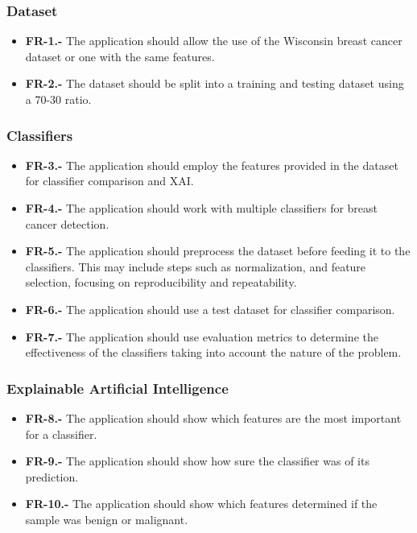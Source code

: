 \subsubsection{Dataset}

\begin{itemize}
    \item \textbf{FR-1.-} The application should allow the use of the Wisconsin breast cancer dataset or one with the same features.
    \item \textbf{FR-2.-} The dataset should be split into a training and testing dataset using a 70-30 ratio.
\end{itemize}

\subsubsection{Classifiers}

\begin{itemize}
    \item \textbf{FR-3.-} The application should employ the features provided in the dataset for classifier comparison and XAI.
    \item \textbf{FR-4.-} The application should work with multiple classifiers for breast cancer detection.
    \item \textbf{FR-5.-} The application should preprocess the dataset before feeding it to the classifiers. This may include steps such as normalization, and feature selection, focusing on reproducibility and repeatability.
    \item \textbf{FR-6.-} The application should use a test dataset for classifier comparison.
    \item \textbf{FR-7.-} The application should use evaluation metrics to determine the effectiveness of the classifiers taking into account the nature of the problem.
\end{itemize}

\subsubsection{Explainable Artificial Intelligence}

\begin{itemize}
    \item \textbf{FR-8.-} The application should show which features are the most important for a classifier.
    \item \textbf{FR-9.-} The application should show how sure the classifier was of its prediction.
    \item \textbf{FR-10.-} The application should show which features determined if the sample was benign or malignant.
\end{itemize}


